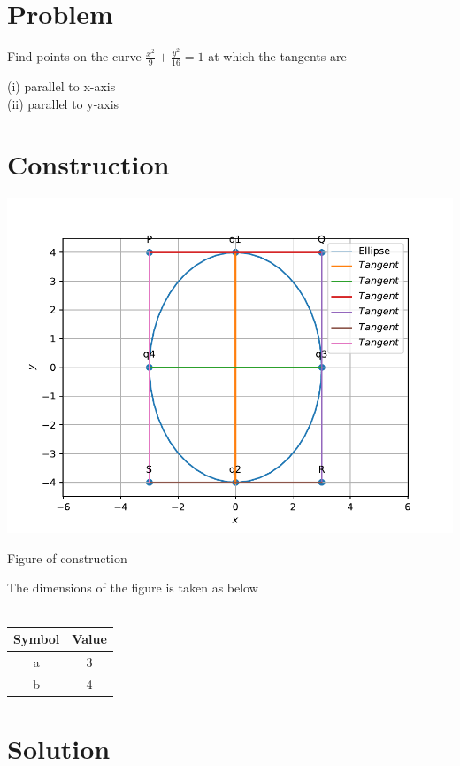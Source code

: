 \documentclass[10pt, a4paper]{article}
\title{\mytitle}
\author{\myauthor\hspace{1em}\\\contact\\FWC22034\hspace{6.5em}IITH\hspace{0.5em}\mymodule\hspace{6em}Assignment}
\begin{document}
	\maketitle
	\tableofcontents
   \section{Problem}
 Find points on the curve $\frac{x^2}{9}+\frac{y^2}{16}=1$ at which the tangents are 
 \begin{center}
 (i) parallel to x-axis\\  
(ii) parallel to y-axis
 \end{center}
\section{Construction}
  \includegraphics[scale=0.5]{conic_1.pdf}
  \begin{center}
  Figure of construction
  	\end{center}
  The dimensions of the figure is taken as below\\\\
{
\setlength\extrarowheight{2pt}
\centering
\begin{tabular}{|c|c|}
 \hline
 \textbf{Symbol}&\textbf{Value}\\
 \hline
 a&3\\
 \hline
 b&4\\
 \hline
\end{tabular}
}	
  \section{Solution}
\end{document}
